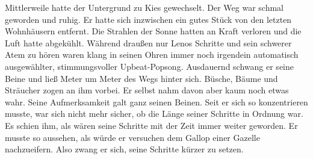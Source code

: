 \documentclass[ngerman,smalldemyvopaper,11pt,oneside,onecolumn,openright,extrafontsizes]{memoir}
\begin{document}
Mittlerweile hatte der Untergrund zu Kies gewechselt. Der Weg war schmal geworden und ruhig. Er hatte sich inzwischen ein gutes Stück von den letzten Wohnhäusern entfernt. Die Strahlen der Sonne hatten an Kraft verloren und die Luft hatte abgekühlt. Während draußen nur Lenos Schritte und sein schwerer Atem zu hören waren klang in seinen Ohren immer noch irgendein automatisch ausgewählter, stimmungsvoller Upbeat-Popsong. Ausdauernd schwang er seine Beine und ließ Meter um Meter des Wegs hinter sich. Büsche, Bäume und Sträucher zogen an ihm vorbei. Er selbst nahm davon aber kaum noch etwas wahr. Seine Aufmerksamkeit galt ganz seinen Beinen. Seit er sich so konzentrieren musste, war sich nicht mehr sicher, ob die Länge seiner Schritte in Ordnung war. Es schien ihm, als wären seine Schritte mit der Zeit immer weiter geworden. Er musste so aussehen, als würde er versuchen dem Gallop einer Gazelle nachzueifern. Also zwang er sich, seine Schritte kürzer zu setzen.\\
\end{document}
